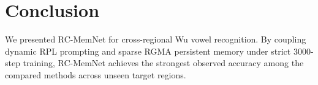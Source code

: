 \documentclass[letterpaper]{article}
\begin{document}
\begin{table}[h]
\centering
\caption{Sensitivity analysis on memory slots per category ($M$) and sparse write top-$K$ access.}
\label{tab:sensitivity}
\end{table}

\section{Conclusion}
We presented RC-MemNet for cross-regional Wu vowel recognition. By coupling dynamic RPL prompting and sparse RGMA persistent memory under strict 3000-step training, RC-MemNet achieves the strongest observed accuracy among the compared methods across unseen target regions.


\end{document}
